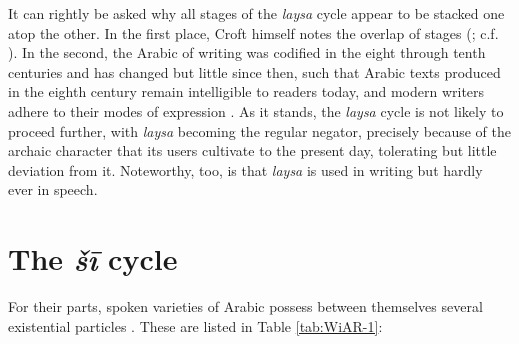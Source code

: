 \documentclass[output=paper]{langsci/langscibook}
\begin{document}
It can rightly be asked why all stages of the \textit{laysa} cycle appear to be stacked one atop the other. In the first place, Croft himself notes the overlap of stages (\citeyear[22]{Croft1991}; c.f. \citealp[146, 149, 151-154]{Veselinova2016}). In the second, the Arabic of writing was codified in the eight through tenth centuries and has changed but little since then, such that Arabic texts produced in the eighth century remain intelligible to readers today, and modern writers adhere to their modes of expression \citep[340]{wilmsen2016a}. As it stands, the \textit{laysa} cycle is not likely to proceed further, with \textit{laysa} becoming the regular negator, precisely because of the archaic character that its users cultivate to the present day, tolerating but little deviation from it. Noteworthy, too, is that \textit{laysa} is used in writing but hardly ever in speech. 

\section{The \textit{šī} cycle\footnotemark}\label{s:WiAR-3}


For their parts, spoken varieties of Arabic possess between themselves several existential particles \citep{eid2008a}. These are listed in Table \ref{tab:WiAR-1}:

\begin{table}[h]
	\centering
	\caption{Existential particles in spoken Arabic varieties}
	\label{tab:WiAR-1}
\end{table}
\end{document}
